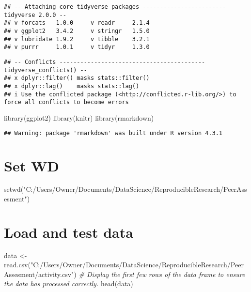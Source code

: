 \documentclass[
]{article}
\newenvironment{Shaded}{\begin{snugshade}}{\end{snugshade}}
\newcommand{\CommentTok}[1]{\textcolor[rgb]{0.56,0.35,0.01}{\textit{#1}}}
\newcommand{\FunctionTok}[1]{\textcolor[rgb]{0.00,0.00,0.00}{#1}}
\newcommand{\NormalTok}[1]{#1}
\newcommand{\OtherTok}[1]{\textcolor[rgb]{0.56,0.35,0.01}{#1}}
\newcommand{\StringTok}[1]{\textcolor[rgb]{0.31,0.60,0.02}{#1}}
\begin{document}
\begin{verbatim}
## -- Attaching core tidyverse packages ------------------------ tidyverse 2.0.0 --
## v forcats   1.0.0     v readr     2.1.4
## v ggplot2   3.4.2     v stringr   1.5.0
## v lubridate 1.9.2     v tibble    3.2.1
## v purrr     1.0.1     v tidyr     1.3.0
\end{verbatim}

\begin{verbatim}
## -- Conflicts ------------------------------------------ tidyverse_conflicts() --
## x dplyr::filter() masks stats::filter()
## x dplyr::lag()    masks stats::lag()
## i Use the conflicted package (<http://conflicted.r-lib.org/>) to force all conflicts to become errors
\end{verbatim}

\begin{Shaded}
\begin{Highlighting}[]
\FunctionTok{library}\NormalTok{(ggplot2)}
\FunctionTok{library}\NormalTok{(knitr)}
\FunctionTok{library}\NormalTok{(rmarkdown)}
\end{Highlighting}
\end{Shaded}

\begin{verbatim}
## Warning: package 'rmarkdown' was built under R version 4.3.1
\end{verbatim}

\hypertarget{set-wd}{%
\section{Set WD}\label{set-wd}}

\begin{Shaded}
\begin{Highlighting}[]
\FunctionTok{setwd}\NormalTok{(}\StringTok{"C:/Users/Owner/Documents/DataScience/ReproducibleResearch/PeerAssesment"}\NormalTok{)}
\end{Highlighting}
\end{Shaded}

\hypertarget{load-and-test-data}{%
\section{Load and test data}\label{load-and-test-data}}

\begin{Shaded}
\begin{Highlighting}[]
\NormalTok{data }\OtherTok{\textless{}{-}} \FunctionTok{read.csv}\NormalTok{(}\StringTok{"C:/Users/Owner/Documents/DataScience/ReproducibleResearch/PeerAssesment/activity.csv"}\NormalTok{)}
\CommentTok{\# Display the first few rows of the data frame to ensure the data has processed correctly.}
\FunctionTok{head}\NormalTok{(data)}
\end{Highlighting}
\end{Shaded}
\end{document}

